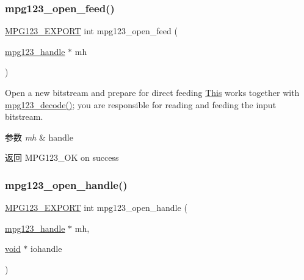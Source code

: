 \subsubsection{\texorpdfstring{mpg123\+\_\+open\+\_\+feed()}{mpg123\_open\_feed()}}
{\footnotesize\ttfamily \hyperlink{mpg123_8h_a2ba98cfba3f760879df70e755b2a61cc}{M\+P\+G123\+\_\+\+E\+X\+P\+O\+RT} int mpg123\+\_\+open\+\_\+feed (\begin{DoxyParamCaption}\item[{\hyperlink{group__mpg123__init_ga6728e2839a395f3a07d4514da659faca}{mpg123\+\_\+handle} $\ast$}]{mh }\end{DoxyParamCaption})}

Open a new bitstream and prepare for direct feeding \hyperlink{namespace_this}{This} works together with \hyperlink{group__mpg123__input_gafaf2382b208257a9685a8cab9f4360be}{mpg123\+\_\+decode()}; you are responsible for reading and feeding the input bitstream. 
\begin{DoxyParams}{参数}
{\em mh} & handle \\
\hline
\end{DoxyParams}
\begin{DoxyReturn}{返回}
M\+P\+G123\+\_\+\+OK on success 
\end{DoxyReturn}
\mbox{\label{group__mpg123__input_gaadda450ea307f88589cb77ffda0754ab}} 
\subsubsection{\texorpdfstring{mpg123\+\_\+open\+\_\+handle()}{mpg123\_open\_handle()}}
{\footnotesize\ttfamily \hyperlink{mpg123_8h_a2ba98cfba3f760879df70e755b2a61cc}{M\+P\+G123\+\_\+\+E\+X\+P\+O\+RT} int mpg123\+\_\+open\+\_\+handle (\begin{DoxyParamCaption}\item[{\hyperlink{group__mpg123__init_ga6728e2839a395f3a07d4514da659faca}{mpg123\+\_\+handle} $\ast$}]{mh,  }\item[{\hyperlink{interfacevoid}{void} $\ast$}]{iohandle }\end{DoxyParamCaption})}

